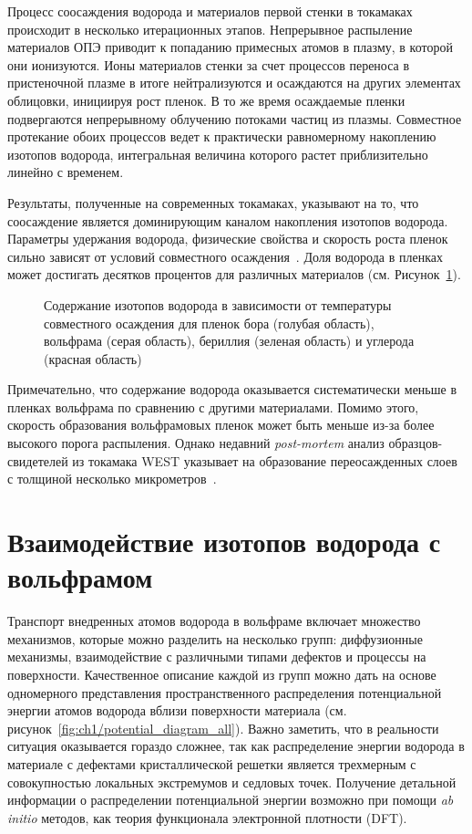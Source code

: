 Процесс соосаждения водорода и материалов первой стенки в токамаках происходит в несколько итерационных этапов. Непрерывное распыление материалов ОПЭ приводит к попаданию примесных атомов в плазму, в которой они ионизуются. Ионы материалов стенки за счет процессов переноса в пристеночной плазме в итоге нейтрализуются и осаждаются на других элементах облицовки, инициируя рост пленок. В то же время осаждаемые пленки подвергаются непрерывному облучению потоками частиц из плазмы. Совместное протекание обоих процессов ведет к практически равномерному накоплению изотопов водорода, интегральная величина которого растет приблизительно линейно с временем.

Результаты, полученные на современных токамаках, указывают на то, что соосаждение является доминирующим каналом накопления изотопов водорода. Параметры удержания водорода, физические свойства и скорость роста пленок сильно зависят от условий совместного осаждения~\cite{Gasparyan2019,Krat2020,Krat2025}. Доля водорода в пленках может достигать десятков процентов для различных материалов (см. Рисунок~\cref{fig:ch1/codeposition_review}).
\begin{figure}[ht]
    \caption{Содержание изотопов водорода в зависимости от температуры совместного осаждения для пленок бора (голубая область), вольфрама (серая область), бериллия (зеленая область) и углерода (красная область)~\cite{Pitts2025}}\label{fig:ch1/codeposition_review}
\end{figure}
Примечательно, что содержание водорода оказывается систематически меньше в пленках вольфрама по сравнению с другими материалами. Помимо этого, скорость образования вольфрамовых пленок может быть меньше из-за более высокого порога распыления. Однако недавний \textit{post-mortem} анализ образцов-свидетелей из токамака WEST указывает на образование переосажденных слоев с толщиной несколько микрометров~\cite{Bucalossi2024}.

\section{Взаимодействие изотопов водорода с вольфрамом}\label{sec:ch1/sec4}

Транспорт внедренных атомов водорода в вольфраме включает множество механизмов, которые можно разделить на несколько групп: диффузионные механизмы, взаимодействие с различными типами дефектов и процессы на поверхности. Качественное описание каждой из групп можно дать на основе одномерного представления пространственного распределения потенциальной энергии атомов водорода вблизи поверхности материала (см. рисунок~\cref{fig:ch1/potential_diagram_all}). Важно заметить, что в реальности ситуация оказывается гораздо сложнее, так как распределение энергии водорода в материале с дефектами кристаллической решетки является трехмерным с совокупностью локальных экстремумов и седловых точек. Получение детальной информации о распределении потенциальной энергии возможно при помощи \textit{ab initio} методов, как теория функционала электронной плотности (DFT). 

